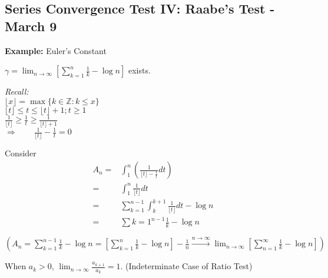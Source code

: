 \documentclass[12pt]{article}
\theoremstyle{plain}
\newcommand{\floor}[1]{\lfloor #1 \rfloor}
\newcommand{\mZ}{{\mathbb{Z}}}
\begin{document}
\subsection{Series Convergence Test IV: Raabe's Test - March 9}
{\color{Brown}
\textbf{Example:} Euler's Constant

$\gamma = \lim_{n\to\infty} [\sum_{k=1}^n \frac 1k - \log n]$ exists.

\textit{Recall:} \\
$\floor{x} = \max \{k \in \mZ : k \leq x\}$	\\
$\floor{t} \leq t \leq \floor{t} + 1; t \geq 1$\\
$\frac 1{\floor{t}} \geq \frac 1t \geq \frac 1{\floor{t} + 1}$	\\
$\Rightarrow \qquad \frac 1{\floor{t}} - \frac 1t = 0$

Consider 
\begin{align*}
	A_n 
	=& \int_1^n (\frac1{\floor t - \frac 1t} dt)	\\
	=& \int_1^n \frac1{\floor t} dt	\\
	=& \sum_{k=1}^{n-1} \int_k^{k+1} \frac1{\floor t}dt - \log n	\\
	=& \sum{k=1}^{n-1} \frac 1k - \log n	\\\\
\end{align*}
$(A_n = \sum_{k=1}^{n-1} \frac 1k - \log n = 
[\sum_{k=1}^n \frac 1k - \log n] - \frac 1n 
\overset{n\to\infty}{\longrightarrow} \lim_{n\to\infty} 
[\sum_{n=1}^{\infty} \frac 1k - \log n])$

When $a_k > 0$, $\lim_{n\to\infty} \frac{a_{k+1}}{a_k} = 1$. 
(Indeterminate Case of Ratio Test)	\\
}
\end{document}
